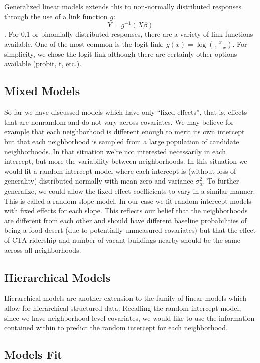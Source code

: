 \documentclass{report}
\begin{document}
Generalized linear models extends this to non-normally distributed responses through the use of a link function $g$: $$Y = g^{-1}(X\beta)$$. For {0,1} or binomially distributed responses, there are a variety of link functions available. One of the most common is the logit link: $g(x) = \log(\frac{x}{1-x})$. For simplicity, we chose the logit link although there are certainly other options available (probit, t, etc.). 

\subsection*{Mixed Models}

So far we have discussed models which have only ``fixed effects'', that is, effects that are nonrandom and do not vary across covariates. We may believe for example that each neighborhood is different enough to merit its own intercept but that each neighborhood is sampled from a large population of candidate neighborhoods. In that situation we're not interested necessarily in each intercept, but more the variability between neighborhoods. In this situation we would fit a random intercept model where each intercept is (without loss of generality) distributed normally with mean zero and variance $\sigma^2_\alpha$.  To further generalize, we could allow the fixed effect coefficients to vary in a similar manner. This is called a random slope model. In our case we fit random intercept models with fixed effects for each slope. This reflects our belief that the neighborhoods are different from each other and should have different baseline probabilities of being a food desert (due to potentially unmeasured covariates) but that the effect of CTA ridership and number of vacant buildings nearby should be the same across all neighborhoods. 

\subsection*{Hierarchical Models}

Hierarchical models are another extension to the family of linear models which allow for hierarchical structured data. Recalling the random intercept model, since we have neighborhood level covariates, we would like to use the information contained within to predict the random intercept for each neighborhood. 
\subsection*{Models Fit}
\end{document}
